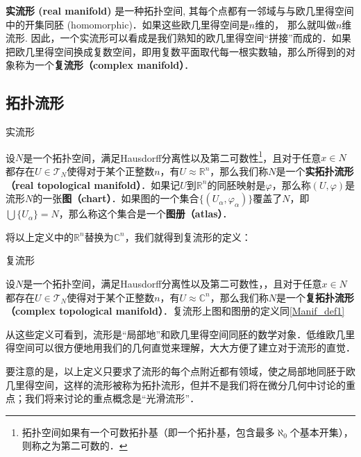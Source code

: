 

\textbf{实流形 (real manifold)} 是一种拓扑空间, 其每个点都有一邻域与与欧几里得空间中的开集同胚 (homomorphic)．如果这些欧几里得空间是$n$维的， 那么就叫做$n$维流形. 因此，一个实流形可以看成是我们熟知的欧几里得空间“拼接”而成的．如果把欧几里得空间换成复数空间，即用复数平面取代每一根实数轴，那么所得到的对象称为一个\textbf{复流形（complex manifold）}．

\subsection{拓扑流形}

\begin{definition}{实流形}\label{Manif_def1}

设$N$是一个拓扑空间，满足Hausdorff分离性以及第二可数性\footnote{拓扑空间如果有一个可数拓扑基（即一个拓扑基，包含最多$\aleph_0$个基本开集），则称之为第二可数的．}，且对于任意$x\in N$都存在$U\in\mathcal{T}_N$使得对于某个正整数$n$，有$U\approx\mathbb{R}^n$，那么我们称$N$是一个\textbf{实拓扑流形（real topological manifold）}．如果记$U$到$\mathbb{R}^n$的同胚映射是$\varphi$，那么称$(U, \varphi)$是流形$N$的一张\textbf{图（chart）}．如果图的一个集合$\{(U_\alpha, \varphi_\alpha)\}$覆盖了$N$，即$\bigcup\{U_\alpha\}=N$，那么称这个集合是一个\textbf{图册（atlas）}．

\end{definition}

将以上定义中的$\mathbb{R}^n$替换为$\mathbb{C}^n$，我们就得到复流形的定义：

\begin{definition}{复流形}

设$N$是一个拓扑空间，满足Hausdorff分离性以及第二可数性，，且对于任意$x\in N$都存在$U\in\mathcal{T}_N$使得对于某个正整数$n$，有$U\approx\mathbb{C}^n$，那么我们称$N$是一个\textbf{复拓扑流形（complex topological manifold）}．复流形上图和图册的定义同\autoref{Manif_def1} 

\end{definition}

从这些定义可看到，流形是“局部地”和欧几里得空间同胚的数学对象．低维欧几里得空间可以很方便地用我们的几何直觉来理解，大大方便了建立对于流形的直觉．

要注意的是，以上定义只要求了流形的每个点附近都有领域，使之局部地同胚于欧几里得空间，这样的流形被称为拓扑流形，但并不是我们将在微分几何中讨论的重点；我们将来讨论的重点概念是“光滑流形”．

